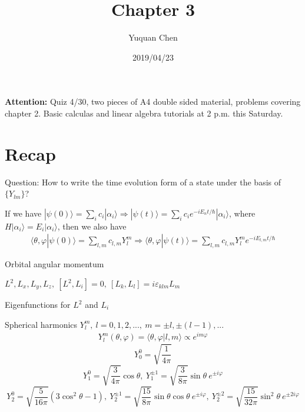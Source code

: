 \documentclass[UTF8,12pt]{article} %
\begin{document}
\title{Chapter 3}
\author{Yuquan Chen}
\date{2019/04/23} %
\maketitle

\textbf{Attention:} Quiz 4/30, two pieces of A4 double sided material, problems covering chapter 2. Basic calculas and linear algebra tutorials at 2 p.m. this Saturday.\\

\section{Recap}

Question: How to write the time evolution form of a state under the basis of $\{Y_{lm}\}$?\par
If we have $|\psi(0)\rangle = \sum_i c_i|\alpha_i\rangle \Rightarrow |\psi(t)\rangle = \sum_i c_i e^{-iE_n t/\hbar}|\alpha_i\rangle$,  where $H|\alpha_i\rangle = E_{i}|\alpha_{i}\rangle$, then we also have
\begin{align}
\langle\theta,\varphi|\psi(0)\rangle = \sum_{l,m}c_{l,m}Y_{l}^{m}\Rightarrow \langle\theta,\varphi|\psi(t)\rangle = \sum_{l,m}c_{l,m}Y_{l}^{m}e^{-iE_{l,m}t/\hbar}
\end{align}

\begin{myboxes}{Orbital angular momentum}{}
\begin{enumerate*}
\item $L^{2}, L_{x}, L_{y}, L_{z},~[L^{2},L_{i}] = 0,~[L_{k},L_{l}] = i\varepsilon_{klm} L_{m}$
\item Eigenfunctions for $L^{2}$ and $L_{i}$
\item Spherical harmonics $Y_{l}^{m},~ l = 0,1,2,...,~ m = \pm l,\pm (l-1),...$
\begin{align}
Y_{l}^{m}(\theta,\varphi) = \langle\theta,\varphi|l,m\rangle\propto e^{im\varphi}
\end{align}
$$Y_{0}^{0} = \sqrt{\frac{1}{4\pi}}$$
$$Y_{1}^{0} = \sqrt{\frac{3}{4\pi}}\cos\theta,~ Y_{1}^{\pm 1} = \sqrt{\frac{3}{8\pi}}\sin\theta ~e^{\pm i\varphi}$$
$$Y_{2}^{0} = \sqrt{\frac{5}{16\pi}}(3\cos^{2}\theta-1),~Y_{2}^{\pm1} = \sqrt{\frac{15}{8\pi}}\sin\theta\cos\theta~e^{\pm i\varphi},~Y_{2}^{\pm2} = \sqrt{\frac{15}{32\pi}}\sin^{2}\theta~e^{\pm2i\varphi}$$
\end{enumerate*}
\end{myboxes}~\\
\end{document}
